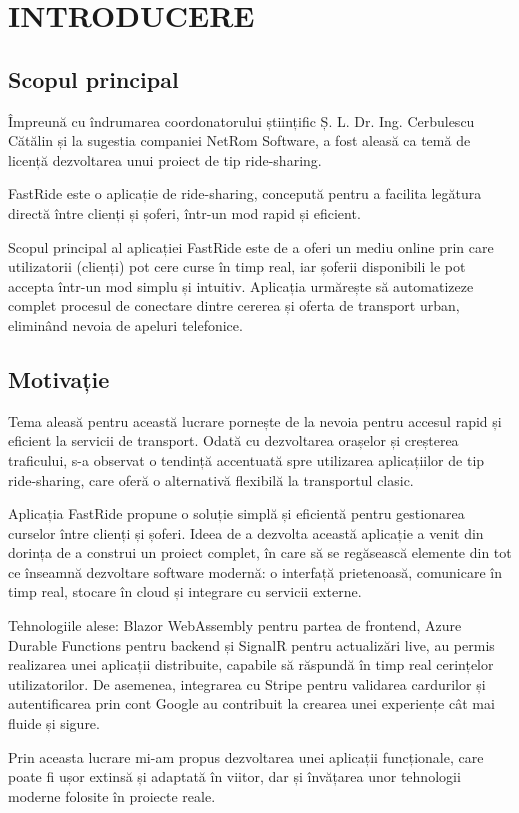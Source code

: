 \chapter{INTRODUCERE}
\section{Scopul principal}
Împreună cu îndrumarea coordonatorului științific Ș. L. Dr. Ing. Cerbulescu Cătălin și la sugestia companiei NetRom Software, a fost aleasă ca temă de licență dezvoltarea unui proiect de tip ride-sharing.

FastRide este o aplicație de ride-sharing, concepută pentru a facilita legătura directă între clienți și șoferi, într-un mod rapid și eficient.

Scopul principal al aplicației FastRide este de a oferi un mediu online prin care utilizatorii (clienți) pot cere curse în timp real, iar șoferii disponibili le pot accepta într-un mod simplu și intuitiv. Aplicația urmărește să automatizeze complet procesul de conectare dintre cererea și oferta de transport urban, eliminând nevoia de apeluri telefonice.

\section{Motivație}
Tema aleasă pentru această lucrare pornește de la nevoia pentru accesul rapid și eficient la servicii de transport. Odată cu dezvoltarea orașelor și creșterea traficului, s-a observat o tendință accentuată spre utilizarea aplicațiilor de tip ride-sharing, care oferă o alternativă flexibilă la transportul clasic.

Aplicația FastRide propune o soluție simplă și eficientă pentru gestionarea curselor între clienți și șoferi. Ideea de a dezvolta această aplicație a venit din dorința de a construi un proiect complet, în care să se regăsească elemente din tot ce înseamnă dezvoltare software modernă: o interfață prietenoasă, comunicare în timp real, stocare în cloud și integrare cu servicii externe.

Tehnologiile alese: Blazor WebAssembly pentru partea de frontend, Azure Durable Functions pentru backend și SignalR pentru actualizări live, au permis realizarea unei aplicații distribuite, capabile să răspundă în timp real cerințelor utilizatorilor. De asemenea, integrarea cu Stripe pentru validarea cardurilor și autentificarea prin cont Google au contribuit la crearea unei experiențe cât mai fluide și sigure.

Prin aceasta lucrare mi-am propus dezvoltarea unei aplicații funcționale, care poate fi ușor extinsă și adaptată în viitor, dar și învățarea unor tehnologii moderne folosite în proiecte reale.